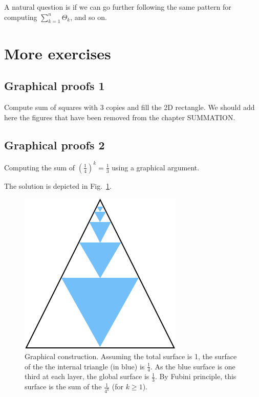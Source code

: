 A natural question is if we can go further following the same pattern for computing $ \sum_{k=1}^{n} \Theta_k$, and so on.

\section{More exercises}

\subsection{Graphical proofs 1}

Compute sum of squares with 3 copies and fill the 2D rectangle. 
We should add here the figures that have been removed from the chapter SUMMATION. 

\subsection{Graphical proofs 2}

Computing the sum of $(\frac{1}{4})^k =\frac{1}{3} $ using a graphical argument.

The solution is depicted in Fig.~\ref{Fig:SUmgeo1sur4}. 
\begin{figure}
\begin{center}
        \includegraphics[scale=0.4]{FiguresArithmetic/SumGeometric1sur4}
        \caption{Graphical construction. Assuming the total surface is 1, the surface of the the internal triangle (in blue) is $\frac{1}{4}$.
        As the blue surface is one third at each layer, the global surface is $\frac{1}{3}$.
        By Fubini principle, this surface is the sum of the $\frac{1}{4^k}$ (for $k \geq 1$).}
        \label{Fig:SUmgeo1sur4}
\end{center}
\end{figure}


